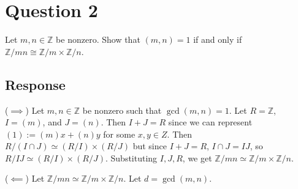 \documentclass [12pt] {article}
\newcommand{\Z}{\mathbb{Z}}
\begin{document}
\newpage
\section*{Question 2}
Let $m,n\in\Z$ be nonzero. Show that $(m,n)=1$ if and only if $\Z/mn\cong \Z/m \times \Z/n$.

\subsection*{Response}
($\implies$) Let $m, n \in \Z$ be nonzero such that $\gcd(m, n) = 1$. Let $R = \Z$, $I = (m)$, and 
$J = (n)$. Then $I + J = R$ since we can represent $(1) := (m)x + (n)y$ for some $x, y \in Z$. Then
$R/(I \cap J) \simeq (R/I) \times (R/J)$ but since $I + J = R$, $I \cap J = IJ$, so
$R/IJ \simeq (R/I) \times (R/J)$. Substituting $I, J, R$, we get
$\Z/mn \simeq \Z/m \times \Z/n$.
\vspace{0.5em}

($\impliedby$) Let $\Z/mn \simeq \Z/m \times \Z/n$. Let $d = \gcd(m, n)$. %








\end{document}
